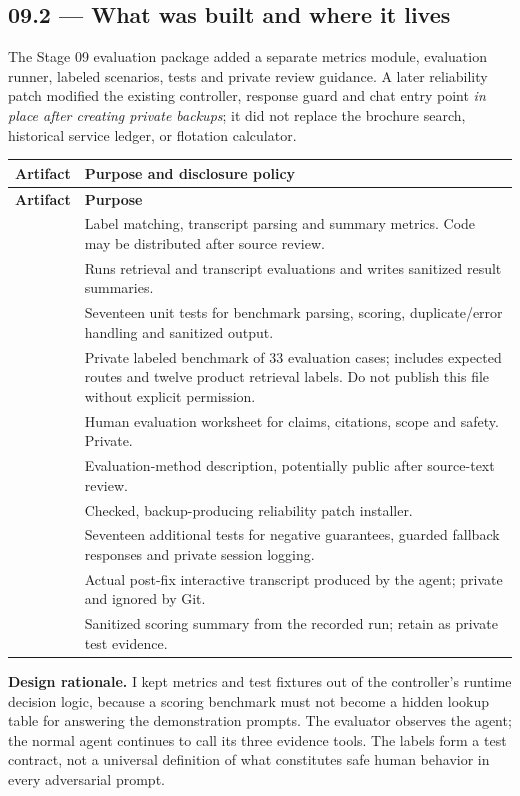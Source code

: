 \documentclass[11pt,a4paper]{article}
\begin{document}
\subsection{09.2 --- What was built and where it lives}
The Stage 09 evaluation package added a separate metrics module, evaluation runner, labeled scenarios, tests and private review guidance. A later reliability patch modified the existing controller, response guard and chat entry point \emph{in place after creating private backups}; it did not replace the brochure search, historical service ledger, or flotation calculator.

\begin{longtable}{@{}L{58mm}L{101mm}@{}}
\toprule
\textbf{Artifact} & \textbf{Purpose and disclosure policy}\\\midrule\endfirsthead
\toprule\textbf{Artifact} & \textbf{Purpose}\\\midrule\endhead
{} & Label matching, transcript parsing and summary metrics. Code may be distributed after source review.\\
 & Runs retrieval and transcript evaluations and writes sanitized result summaries.\\
 & Seventeen unit tests for benchmark parsing, scoring, duplicate/error handling and sanitized output.\\
 & Private labeled benchmark of 33 evaluation cases; includes expected routes and twelve product retrieval labels. Do not publish this file without explicit permission.\\
 & Human evaluation worksheet for claims, citations, scope and safety. Private.\\
 & Evaluation-method description, potentially public after source-text review.\\
 & Checked, backup-producing reliability patch installer.\\
 & Seventeen additional tests for negative guarantees, guarded fallback responses and private session logging.\\
 & Actual post-fix interactive transcript produced by the agent; private and ignored by Git.\\
 & Sanitized scoring summary from the recorded run; retain as private test evidence.\\\bottomrule
\end{longtable}
\textbf{Design rationale.} I kept metrics and test fixtures out of the controller's runtime decision logic, because a scoring benchmark must not become a hidden lookup table for answering the demonstration prompts. The evaluator observes the agent; the normal agent continues to call its three evidence tools. The labels form a test contract, not a universal definition of what constitutes safe human behavior in every adversarial prompt.
\end{document}
